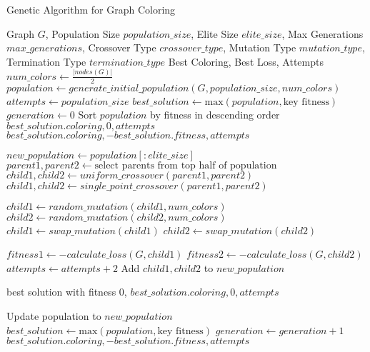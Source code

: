 \documentclass{article}
\begin{document}
\begin{algorithm}
\caption{Genetic Algorithm for Graph Coloring}
\begin{algorithmic}[1]
\REQUIRE Graph $G$, Population Size $population\_size$, Elite Size $elite\_size$, Max Generations $max\_generations$, Crossover Type $crossover\_type$, Mutation Type $mutation\_type$, Termination Type $termination\_type$
\ENSURE Best Coloring, Best Loss, Attempts
\STATE $num\_colors \gets \frac{|nodes(G)|}{2}$
\STATE $population \gets generate\_initial\_population(G, population\_size, num\_colors)$
\STATE $attempts \gets population\_size$
\STATE $best\_solution \gets \text{max}(population, \text{key fitness})$
\STATE $generation \gets 0$
    \STATE Sort $population$ by fitness in descending order
        \RETURN $best\_solution.coloring, 0, attempts$
    \ENDIF
        \RETURN $best\_solution.coloring, -best\_solution.fitness, attempts$
    \ENDIF

    \STATE $new\_population \gets population[:elite\_size]$
        \STATE $parent1, parent2 \gets \text{select parents from top half of population}$
            \STATE $child1, child2 \gets uniform\_crossover(parent1, parent2)$
        \ELSE
            \STATE $child1, child2 \gets single\_point\_crossover(parent1, parent2)$
        \ENDIF

            \STATE $child1 \gets random\_mutation(child1, num\_colors)$
            \STATE $child2 \gets random\_mutation(child2, num\_colors)$
        \ELSE
            \STATE $child1 \gets swap\_mutation(child1)$
            \STATE $child2 \gets swap\_mutation(child2)$
        \ENDIF

        \STATE $fitness1 \gets -calculate\_loss(G, child1)$
        \STATE $fitness2 \gets -calculate\_loss(G, child2)$
        \STATE $attempts \gets attempts + 2$
        \STATE Add $child1, child2$ to $new\_population$

            \RETURN best solution with fitness 0, $best\_solution.coloring, 0, attempts$
        \ENDIF
    \ENDWHILE

    \STATE Update population to $new\_population$
    \STATE $best\_solution \gets \text{max}(population, \text{key fitness})$
    \STATE $generation \gets generation + 1$
\ENDWHILE
\RETURN $best\_solution.coloring, -best\_solution.fitness, attempts$
\end{algorithmic}
\end{algorithm}
\end{document}
